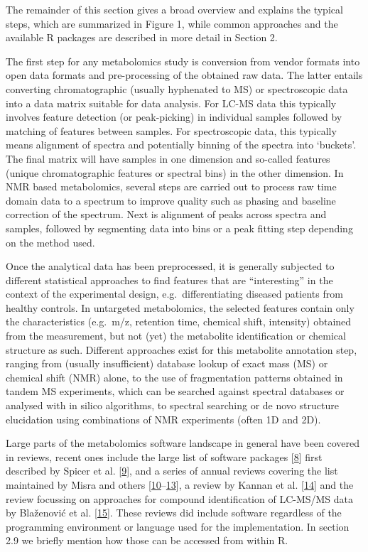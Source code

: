 \documentclass[]{article}
\begin{document}
The remainder of this section gives a broad overview and explains the typical steps, which are summarized in Figure 1, while common approaches and the available R packages are described in more detail in Section 2.

The first step for any metabolomics study is conversion from vendor formats into open data formats and pre-processing of the obtained raw data. The latter entails converting chromatographic (usually hyphenated to MS) or spectroscopic data into a data matrix suitable for data analysis. For LC-MS data this typically involves feature detection (or peak-picking) in individual samples followed by matching of features between samples. For spectroscopic data, this typically means alignment of spectra and potentially binning of the spectra into `buckets'. The final matrix will have samples in one dimension and so-called features (unique chromatographic features or spectral bins) in the other dimension. In NMR based metabolomics, several steps are carried out to process raw time domain data to a spectrum to improve quality such as phasing and baseline correction of the spectrum. Next is alignment of peaks across spectra and samples, followed by segmenting data into bins or a peak fitting step depending on the method used.

Once the analytical data has been preprocessed, it is generally subjected to different statistical approaches to find features that are ``interesting'' in the context of the experimental design, e.g.~differentiating diseased patients from healthy controls.
In untargeted metabolomics, the selected features contain only the characteristics (e.g.~m/z, retention time, chemical shift, intensity) obtained from the measurement, but not (yet) the metabolite identification or chemical structure as such. Different approaches exist for this metabolite annotation step, ranging from (usually insufficient) database lookup of exact mass (MS) or chemical shift (NMR) alone, to the use of fragmentation patterns obtained in tandem MS experiments, which can be searched against spectral databases or analysed with in silico algorithms, to spectral searching or de novo structure elucidation using combinations of NMR experiments (often 1D and 2D).

Large parts of the metabolomics software landscape in general have been covered in reviews, recent ones include the large list of software packages {[}\protect\hyperlink{ref-spicer_website_2018}{8}{]} first described by Spicer et al. {[}\protect\hyperlink{ref-spicer_2017}{9}{]}, and a series of annual reviews covering the list maintained by Misra and others {[}\protect\hyperlink{ref-misra_2016}{10}--\protect\hyperlink{ref-misra_website_2017}{13}{]}, a review by Kannan et al. {[}\protect\hyperlink{ref-kannan_2016}{14}{]} and the review focussing on approaches for compound identification of LC-MS/MS data by Blaženović et al. {[}\protect\hyperlink{ref-blaenovi_2018}{15}{]}. These reviews did include software regardless of the programming environment or language used for the implementation. In section 2.9 we briefly mention how those can be accessed from within R.
\end{document}
